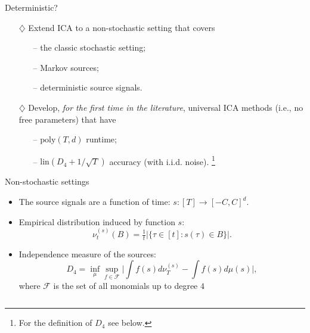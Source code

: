 \documentclass[final]{beamer} %
\begin{document}
\begin{frame}[c]
\begin{columns}[t,totalwidth=\textwidth]
\begin{column}{.24\textwidth}
\begin{block}{Deterministic?}
			\vspace{1cm}
			\begin{tcolorbox}[title = \vspace{0.4cm}\textbf{\large Our Contributions} \vspace{0.4cm}, title filled, width = 0.9\textwidth, colback = uofagreen!10, colframe = red]
			\begin{itemize}
			\vspace{0.5cm}
			\item[$\diamondsuit$] Extend ICA to a non-stochastic setting that covers
			\begin{itemize}
			\item[--] the classic stochastic setting;
			\item[--] Markov sources;
			\item[--] deterministic source signals.
			\end{itemize} 
			\vspace{1cm}
			\item[$\diamondsuit$] Develop, \emph{for the first time in the literature}, 
			\alert{universal} ICA methods (i.e., no free parameters) that 
			have
				\begin{itemize}
					\item[--] $\mathrm{poly}(T,d)$ runtime;
					\item[--] $\mathrm{lin}(D_4+1/\sqrt{T})$ accuracy (with i.i.d. noise).%
					\footnote{For the definition of $D_4$ see below.}
					\vspace{1cm}
				\end{itemize}
			\end{itemize}		
			\end{tcolorbox}
		\end{block}
		\vspace{0.5ex}
		\begin{block}{Non-stochastic settings}
			\begin{itemize}
				\item The source signals are a function of time: $s:[T] \to [-C,C]^d$.
				\item Empirical distribution induced by function $s$:
				\[
					\nu_t^{(s)}(B)=\tfrac{1}{t}|\{\tau \in [t]: s(\tau) \in B\}|.
				\]
				\item Independence measure of the sources:
				\[
				D_4
				= \inf_{\mu} \sup_{f\in\mathcal{F}} \Big|\int f(s)d\nu_T^{(s)} - \int f(s)d\mu(s)\Big|,
				\]
				where $\mathcal{F}$ is the set of all monomials up to degree $4$

\end{itemize}
\end{block}
\end{column}
\end{columns}
\end{frame}
\end{document}
